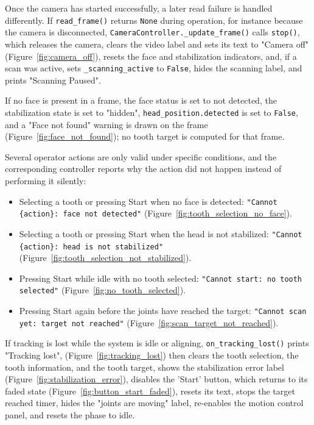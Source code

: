 Once the camera has started successfully, a later read failure is handled differently. If \texttt{read\_frame()} returns \texttt{None} during operation, for instance because the camera is disconnected, \texttt{CameraController.\_update\_frame()} calls \texttt{stop()}, which releases the camera, clears the video label and sets its text to "Camera off" (Figure~\ref{fig:camera_off}), resets the face and stabilization indicators, and, if a scan was active, sets \texttt{\_scanning\_active} to \texttt{False}, hides the scanning label, and prints "Scanning Paused".

If no face is present in a frame, the face status is set to not detected, the stabilization state is set to "hidden", \texttt{head\_position.detected} is set to \texttt{False}, and a "Face not found" warning is drawn on the frame (Figure~\ref{fig:face_not_found}); no tooth target is computed for that frame.

Several operator actions are only valid under specific conditions, and the corresponding controller reports why the action did not happen instead of performing it silently:

\begin{itemize}
    \item Selecting a tooth or pressing Start when no face is detected: \texttt{"Cannot \{action\}: face not detected"} (Figure~\ref{fig:tooth_selection_no_face}).
    \item Selecting a tooth or pressing Start when the head is not stabilized: \texttt{"Cannot \{action\}: head is not stabilized"} (Figure~\ref{fig:tooth_selection_not_stabilized}).
    \item Pressing Start while idle with no tooth selected: \texttt{"Cannot start: no tooth selected"} (Figure~\ref{fig:no_tooth_selected}).
    \item Pressing Start again before the joints have reached the target: \texttt{"Cannot scan yet: target not reached"} (Figure~\ref{fig:scan_target_not_reached}).
\end{itemize}

If tracking is lost while the system is idle or aligning, \texttt{on\_tracking\_lost()} prints "Tracking lost", (Figure~\ref{fig:tracking_lost}) then clears the tooth selection, the tooth information, and the tooth target, shows the stabilization error label (Figure~\ref{fig:stabilization_error}), disables the 'Start' button, which returns to its faded state (Figure~\ref{fig:button_start_faded}), resets its text, stops the target reached timer, hides the "joints are moving" label, re-enables the motion control panel, and resets the phase to idle.

